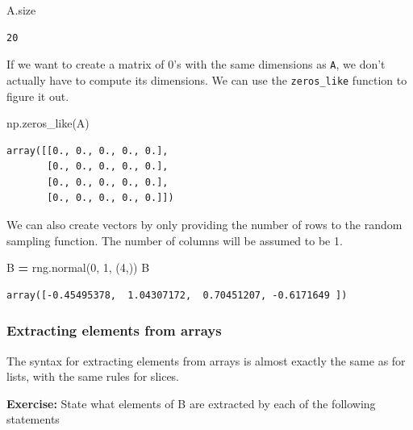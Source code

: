 \documentclass[
  letterpaper,
]{scrbook}
\newenvironment{Shaded}{\begin{snugshade}}{\end{snugshade}}
\newcommand{\DecValTok}[1]{\textcolor[rgb]{0.00,0.00,0.81}{#1}}
\newcommand{\NormalTok}[1]{#1}
\newcommand{\OperatorTok}[1]{\textcolor[rgb]{0.81,0.36,0.00}{\textbf{#1}}}
\begin{document}
\begin{Shaded}
\begin{Highlighting}[]
\NormalTok{A.size}
\end{Highlighting}
\end{Shaded}

\begin{verbatim}
20
\end{verbatim}

If we want to create a matrix of 0's with the same dimensions as \texttt{A}, we don't actually have to compute its dimensions. We can use the \texttt{zeros\_like} function to figure it out.

\begin{Shaded}
\begin{Highlighting}[]
\NormalTok{np.zeros_like(A)}
\end{Highlighting}
\end{Shaded}

\begin{verbatim}
array([[0., 0., 0., 0., 0.],
       [0., 0., 0., 0., 0.],
       [0., 0., 0., 0., 0.],
       [0., 0., 0., 0., 0.]])
\end{verbatim}

We can also create vectors by only providing the number of rows to the random sampling function. The number of columns will be assumed to be 1.

\begin{Shaded}
\begin{Highlighting}[]
\NormalTok{B }\OperatorTok{=}\NormalTok{ rng.normal(}\DecValTok{0}\NormalTok{, }\DecValTok{1}\NormalTok{, (}\DecValTok{4}\NormalTok{,))}
\NormalTok{B}
\end{Highlighting}
\end{Shaded}

\begin{verbatim}
array([-0.45495378,  1.04307172,  0.70451207, -0.6171649 ])
\end{verbatim}

\hypertarget{extracting-elements-from-arrays}{%
\subsubsection{Extracting elements from arrays}\label{extracting-elements-from-arrays}}

The syntax for extracting elements from arrays is almost exactly the same as for lists, with the same rules for slices.

\textbf{Exercise:} State what elements of B are extracted by each of the following statements
\end{document}
